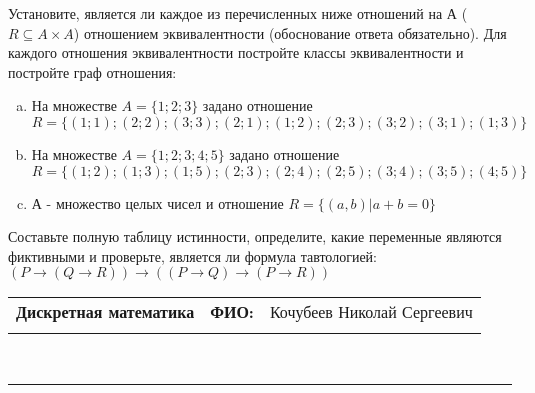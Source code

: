 \documentclass[10pt]{exam}
\newcommand{\class}{Дискретная математика}
\newcommand{\examdate}{}
\begin{document}
\begin{questions}
\question
Установите, является ли каждое из перечисленных ниже отношений на А ($R \subseteq A \times A$) отношением эквивалентности (обоснование ответа обязательно). Для каждого отношения эквивалентности постройте классы 
эквивалентности и постройте граф отношения:
\begin{enumerate} [a)]\setcounter{enumi}{0}
\item На множестве $A = \{1; 2; 3\}$ задано отношение $R = \{(1; 1); (2; 2); (3; 3); (2; 1); (1; 2); (2; 3); (3; 2); (3; 1); (1; 3)\}$
\item На множестве $A = \{1; 2; 3; 4; 5\}$ задано отношение $R = \{(1; 2); (1; 3); (1; 5); (2; 3); (2; 4); (2; 5); (3; 4); (3; 5); (4; 5)\}$
\item А - множество целых чисел и отношение $R = \{(a,b)|a + b = 0\}$
\end{enumerate}\question Составьте полную таблицу истинности, определите, какие переменные являются фиктивными и проверьте, является ли формула тавтологией:
$(P \rightarrow (Q \rightarrow R)) \rightarrow ((P \rightarrow Q) \rightarrow (P \rightarrow R))$

\end{questions}
\newpage
\begin{flushright}
\begin{tabular}{p{2.8in} r l}
\textbf{\class} & \textbf{ФИО:} &Кочубеев Николай Сергеевич
\\

\textbf{\examdate} &&\\
\end{tabular}\\
\end{flushright}
\rule[1ex]{\textwidth}{.1pt}
\end{document}
